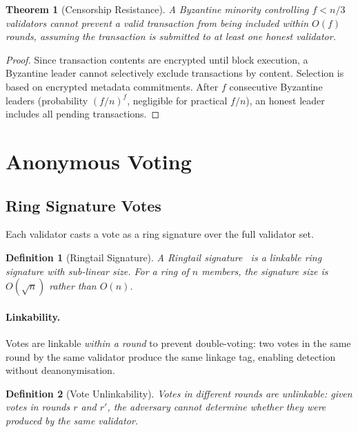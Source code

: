 \documentclass[11pt,a4paper]{article}
\newtheorem{definition}{Definition}[section]
\newtheorem{theorem}{Theorem}[section]
\begin{document}
\begin{theorem}[Censorship Resistance]
    A Byzantine minority controlling $f < n/3$ validators cannot
    prevent a valid transaction from being included within $O(f)$
    rounds, assuming the transaction is submitted to at least one
    honest validator.
\end{theorem}

\begin{proof}
    Since transaction contents are encrypted until block execution, a
    Byzantine leader cannot selectively exclude transactions by content.
    Selection is based on encrypted metadata commitments.  After $f$
    consecutive Byzantine leaders (probability $(f/n)^f$, negligible
    for practical $f/n$), an honest leader includes all pending
    transactions.
\end{proof}

\section{Anonymous Voting}
\label{sec:voting}

\subsection{Ring Signature Votes}

Each validator casts a vote as a ring signature over the full validator
set.

\begin{definition}[Ringtail Signature]
    A Ringtail signature~\cite{ringtail2023} is a linkable ring signature
    with sub-linear size.  For a ring of $n$ members, the signature size
    is $O(\sqrt{n})$ rather than $O(n)$.
\end{definition}

\paragraph{Linkability.}
Votes are linkable \emph{within a round} to prevent double-voting: two
votes in the same round by the same validator produce the same linkage
tag, enabling detection without deanonymisation.

\begin{definition}[Vote Unlinkability]
    Votes in different rounds are unlinkable: given votes in rounds $r$
    and $r'$, the adversary cannot determine whether they were produced
    by the same validator.
\end{definition}
\end{document}
